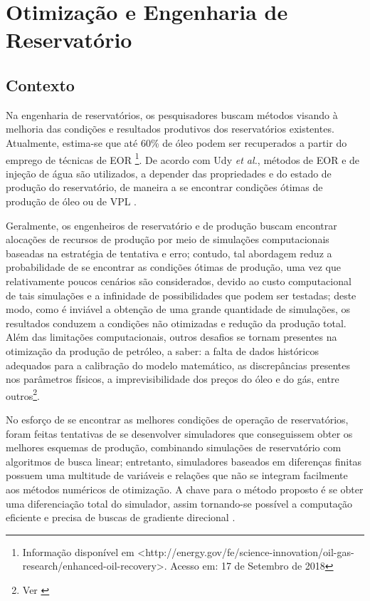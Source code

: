 \section{Otimiza\c{c}\~{a}o e Engenharia de Reservat\'{o}rio}
\subsection{Contexto}
Na engenharia de reservat\'{o}rios, os pesquisadores buscam m\'{e}todos visando \`{a} melhoria das condi\c{c}\~{o}es e resultados produtivos dos reservat\'{o}rios existentes. Atualmente, estima-se que at\'{e} 60\% de \'{o}leo podem ser recuperados a partir do emprego de t\'{e}cnicas de EOR \footnote{Informa\c{c}\~{a}o dispon\'{i}vel em <http://energy.gov/fe/science-innovation/oil-gas-research/enhanced-oil-recovery>. Acesso em: 17 de Setembro de 2018}. De acordo com Udy \textit{et al.}, m\'{e}todos de EOR e de inje\c{c}\~{a}o de \'{a}gua s\~{a}o utilizados, a depender das propriedades e do estado de produ\c{c}\~{a}o do reservat\'{o}rio, de maneira a se encontrar condi\c{c}\~{o}es \'{o}timas de produ\c{c}\~{a}o de \'{o}leo ou de VPL \cite{udyEOR}.

Geralmente, os engenheiros de reservat\'{o}rio e de produ\c{c}\~{a}o buscam encontrar aloca\c{c}\~{o}es de recursos de produ\c{c}\~{a}o por meio de simula\c{c}\~{o}es computacionais baseadas na estrat\'{e}gia de tentativa e erro; contudo, tal abordagem reduz a probabilidade de se encontrar as condi\c{c}\~{o}es \'{o}timas de produ\c{c}\~{a}o, uma vez que relativamente poucos cen\'{a}rios s\~{a}o considerados, devido ao custo computacional de tais simula\c{c}\~{o}es e a infinidade de possibilidades que podem ser testadas; deste modo, como \'{e} invi\'{a}vel a obten\c{c}\~{a}o de uma grande quantidade de simula\c{c}\~{o}es, os resultados conduzem a condi\c{c}\~{o}es n\~{a}o otimizadas e redu\c{c}\~{a}o da produ\c{c}\~{a}o total. Al\'{e}m das limita\c{c}\~{o}es computacionais, outros desafios se tornam presentes na otimiza\c{c}\~{a}o da produ\c{c}\~{a}o de petr\'{o}leo, a saber: a falta de dados hist\'{o}ricos adequados para a calibra\c{c}\~{a}o do modelo matem\'{a}tico, as discrep\^{a}ncias presentes nos par\^{a}metros f\'{i}sicos, a imprevisibilidade dos pre\c{c}os do \'{o}leo e do g\'{a}s, entre outros\footnote{Ver \cite{udyEOR}}.

No esfor\c{c}o de se encontrar as melhores condi\c{c}\~{o}es de opera\c{c}\~{a}o de reservat\'{o}rios, foram feitas tentativas de se desenvolver simuladores que conseguissem obter os melhores esquemas de produ\c{c}\~{a}o, combinando simula\c{c}\~{o}es de reservat\'{o}rio com algoritmos de busca linear; entretanto, simuladores baseados em diferen\c{c}as finitas possuem uma multitude de vari\'{a}veis e rela\c{c}\~{o}es que n\~{a}o se integram facilmente aos m\'{e}todos num\'{e}ricos de otimiza\c{c}\~{a}o. A chave para o m\'{e}todo proposto \'{e} se obter uma diferencia\c{c}\~{a}o total do simulador, assim tornando-se poss\'{i}vel a computa\c{c}\~{a}o eficiente e precisa de buscas de gradiente direcional \cite{asheim88}. 

